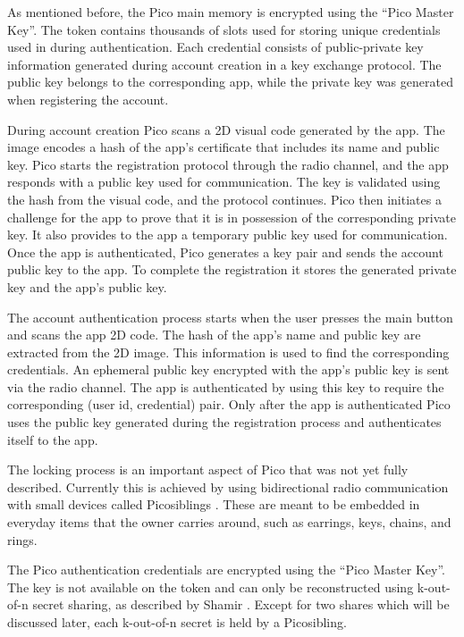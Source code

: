 As mentioned before, the Pico main memory is encrypted using the ``Pico Master Key''. The token contains thousands of slots used for storing unique credentials used in during authentication. Each credential consists of public-private key information generated during account creation in a key exchange protocol. The public key belongs to the corresponding app, while the private key was generated when registering the account. 

During account creation Pico scans a 2D visual code generated by the app. The image encodes a hash of the app's certificate that includes its name and public key. Pico starts the registration protocol through the radio channel, and the app responds with a public key used for communication. The key is validated using the hash from the visual code, and the protocol continues. Pico then initiates a challenge for the app to prove that it is in possession of the corresponding private key. It also provides to the app a temporary public key used for communication. Once the app is authenticated, Pico generates a key pair and sends the account public key to the app. To complete the registration it stores the generated private key and the app's public key.

The account authentication process starts when the user presses the main button and scans the app 2D code. The hash of the app's name and public key are extracted from the 2D image. This information is used to find the corresponding credentials. An ephemeral public key encrypted with the app's public key is sent via the radio channel. The app is authenticated by using this key to require the corresponding (user id, credential) pair. Only after the app is authenticated Pico uses the public key generated during the registration process and authenticates itself to the app.

The locking process is an important aspect of Pico that was not yet fully described. Currently this is achieved by using bidirectional radio communication with small devices called Picosiblings \cite{stannard2012good}. These are meant to be embedded in everyday items that the owner carries around, such as earrings, keys, chains, and rings.

The Pico authentication credentials are encrypted using the ``Pico Master Key''. The key is not available on the token and can only be reconstructed using k-out-of-n secret sharing, as described by Shamir \cite{shamir1979share}. Except for two shares which will be discussed later, each k-out-of-n secret is held by a Picosibling. 

